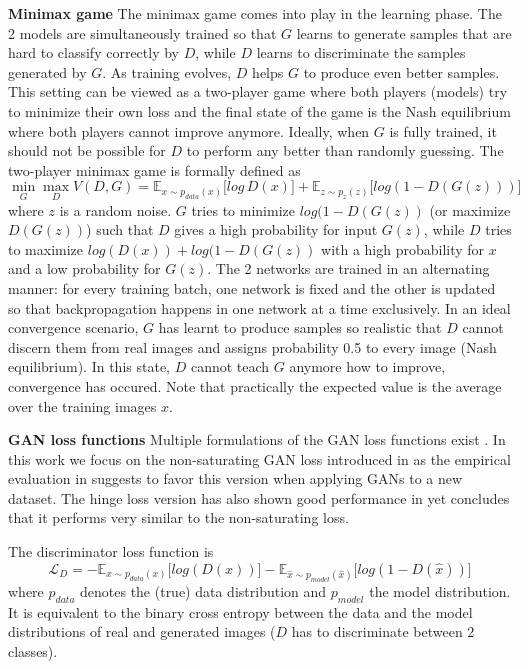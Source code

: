 \documentclass[a4paper,12pt]{report}
\begin{document}
\par \textbf{Minimax game} The minimax game comes into play in the learning phase. The 2 models are simultaneously trained so that $G$ learns to generate samples that are hard to classify correctly by $D$, while $D$ learns to discriminate the samples generated by $G$. As training evolves, $D$ helps $G$ to produce even better samples. This setting can be viewed as a two-player game where both players (models) try to minimize their own loss and the final state of the game is the Nash equilibrium where both players cannot improve anymore. Ideally, when $G$ is fully trained, it should not be possible for $D$ to perform any better than randomly guessing. The two-player minimax game is formally defined as
\begin{equation} \label{eq:1}
\min\limits_{G} \max\limits_{D} V(D,G) = \mathbb{E}_{x\sim p_{data} (x)}\big[log\, D(x)\big] + \mathbb{E}_{z\sim p_{z} (z)}\big[log(1 - D(G(z)))\big]
\end{equation}
where $z$ is a random noise. $G$ tries to minimize $log(1 - D(G(z))$ (or maximize $D(G(z))$) such that $D$ gives a high probability for input $G(z)$, while $D$ tries to maximize $log(D(x)) + log(1 - D(G(z))$ with a high probability for $x$ and a low probability for $G(z)$. The 2 networks are trained in an alternating manner: for every training batch, one network is fixed and the other is updated so that backpropagation happens in one network at a time exclusively. In an ideal convergence scenario, $G$ has learnt to produce samples so realistic that $D$ cannot discern them from real images and assigns probability 0.5 to every image (Nash equilibrium). In this state, $D$ cannot teach $G$ anymore how to improve, convergence has occured. Note that practically the expected value is the average over the training images $x$.

\par \textbf{GAN loss functions} 
Multiple formulations of the GAN loss functions exist \cite{GANLandscape}. In this work we focus on the non-saturating GAN loss introduced in \cite{1406.2661} as the empirical evaluation in \cite{GANLandscape} suggests to favor this version when applying GANs to a new dataset. The hinge loss version has also shown good performance in \cite{SNGAN} yet \cite{GANLandscape} concludes that it performs very similar to the non-saturating loss.

The discriminator loss function is
\begin{equation} \label{eq:d_loss}
    \mathcal{L}_{D} = -\mathbb{E}_{x\sim p_{data} (x)}\big[log(D(x))\big] - \mathbb{E}_{\hat{x}\sim p_{model} (\hat{x})}\big[log(1 - D(\hat{x}))\big]
\end{equation}
where $p_{data}$ denotes the (true) data distribution and $p_{model}$ the model distribution. It is equivalent to the binary cross entropy between the data and the model distributions of real and generated images ($D$ has to discriminate between 2 classes).
\end{document}
